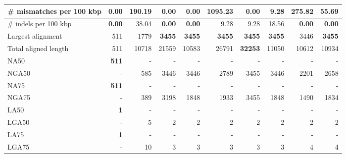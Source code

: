\documentclass[12pt,a4paper]{article}
\begin{document}
\begin{table}[ht]
\begin{center}
\begin{tabular}{|l*{9}{|r}|}
\# mismatches per 100 kbp & {\bf 0.00} & 190.19 & {\bf 0.00} & {\bf 0.00} & 1095.23 & {\bf 0.00} & 9.28 & 275.82 & 55.69 \\ \hline
\# indels per 100 kbp & {\bf 0.00} & 38.04 & {\bf 0.00} & {\bf 0.00} & 9.28 & 9.28 & 18.56 & {\bf 0.00} & {\bf 0.00} \\ \hline
Largest alignment & 511 & 1779 & {\bf 3455} & {\bf 3455} & {\bf 3455} & {\bf 3455} & {\bf 3455} & 3446 & {\bf 3455} \\ \hline
Total aligned length & 511 & 10718 & 21559 & 10583 & 26791 & {\bf 32253} & 11050 & 10612 & 10934 \\ \hline
NA50 & {\bf 511} & - & - & - & - & - & - & - & - \\ \hline
NGA50 & - & 585 & 3446 & 3446 & 2789 & 3455 & 3446 & 2201 & 2658 \\ \hline
NA75 & {\bf 511} & - & - & - & - & - & - & - & - \\ \hline
NGA75 & - & 389 & 3198 & 1848 & 1933 & 3455 & 1848 & 1490 & 1834 \\ \hline
LA50 & {\bf 1} & - & - & - & - & - & - & - & - \\ \hline
LGA50 & - & 5 & 2 & 2 & 2 & 2 & 2 & 2 & 2 \\ \hline
LA75 & {\bf 1} & - & - & - & - & - & - & - & - \\ \hline
LGA75 & - & 10 & 3 & 3 & 3 & 3 & 3 & 4 & 4 \\ \hline
\end{tabular}
\end{center}
\end{table}
\end{document}
